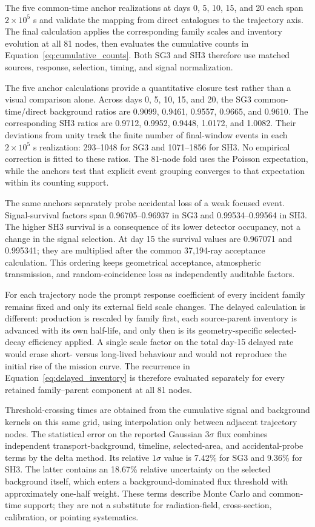 \documentclass[11pt]{article}
\begin{document}
The five common-time anchor realizations at days 0, 5, 10, 15, and 20 each span
$2\times10^5$ s and validate the mapping from direct catalogues to the trajectory
axis. The final calculation applies the corresponding family scales and
inventory evolution at all 81 nodes, then evaluates the cumulative counts in
Equation~\eqref{eq:cumulative_counts}. Both SG3 and SH3 therefore use matched
sources, response, selection, timing, and signal normalization.

The five anchor calculations provide a quantitative closure test rather than a
visual comparison alone. Across days 0, 5, 10, 15, and 20, the SG3
common-time/direct background ratios are 0.9099, 0.9461, 0.9557, 0.9665, and
0.9610. The corresponding SH3 ratios are 0.9712, 0.9952, 0.9448, 1.0172, and
1.0082. Their deviations from unity track the finite number of final-window
events in each $2\times10^5$ s realization: 293--1048 for SG3 and 1071--1856
for SH3. No empirical correction is fitted to these ratios. The 81-node fold
uses the Poisson expectation, while the anchors test that explicit event
grouping converges to that expectation within its counting support.

The same anchors separately probe accidental loss of a weak focused event.
Signal-survival factors span 0.96705--0.96937 in SG3 and
0.99534--0.99564 in SH3. The higher SH3 survival is a consequence of its lower
detector occupancy, not a change in the signal selection. At day 15 the
survival values are 0.967071 and 0.995341; they are multiplied after the common
37,194-ray acceptance calculation. This ordering keeps geometrical acceptance,
atmospheric transmission, and random-coincidence loss as independently
auditable factors.

For each trajectory node the prompt response coefficient of every incident
family remains fixed and only its external field scale changes. The delayed
calculation is different: production is rescaled by family first, each
source-parent inventory is advanced with its own half-life, and only then is its
geometry-specific selected-decay efficiency applied. A single scale factor on
the total day-15 delayed rate would erase short- versus long-lived behaviour and
would not reproduce the initial rise of the mission curve. The recurrence in
Equation~\eqref{eq:delayed_inventory} is therefore evaluated separately for
every retained family--parent component at all 81 nodes.

Threshold-crossing times are obtained from the cumulative signal and
background kernels on this same grid, using interpolation only between adjacent
trajectory nodes. The statistical error on the reported Gaussian
$3\sigma$ flux combines independent transport-background, timeline,
selected-area, and accidental-probe terms by the delta method. Its relative
$1\sigma$ value is 7.42\% for SG3 and 9.36\% for SH3. The latter contains an
18.67\% relative uncertainty on the selected background itself, which enters a
background-dominated flux threshold with approximately one-half weight. These
terms describe Monte Carlo and common-time support; they are not a substitute
for radiation-field, cross-section, calibration, or pointing systematics.
\end{document}
